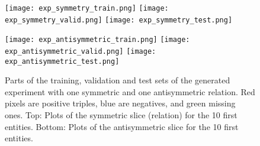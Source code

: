 \documentclass{article}
\begin{document}
\begin{figure}
	\centering
	\texttt{[image: exp\_symmetry\_train.png]}
	\texttt{[image: exp\_symmetry\_valid.png]}
	\texttt{[image: exp\_symmetry\_test.png]}
	
	\texttt{[image: exp\_antisymmetric\_train.png]}
	\texttt{[image: exp\_antisymmetric\_valid.png]}
	\texttt{[image: exp\_antisymmetric\_test.png]}

    \caption{Parts of the training, validation and test sets of the generated experiment with one symmetric and one antisymmetric relation. Red pixels are positive triples, blue are negatives, and green missing ones. Top: Plots of the symmetric slice (relation) for the 10 first entities. Bottom: Plots of the antisymmetric slice for the 10 first entities.}
	\label{fig:symmetry_example}
\end{figure}
\end{document}
